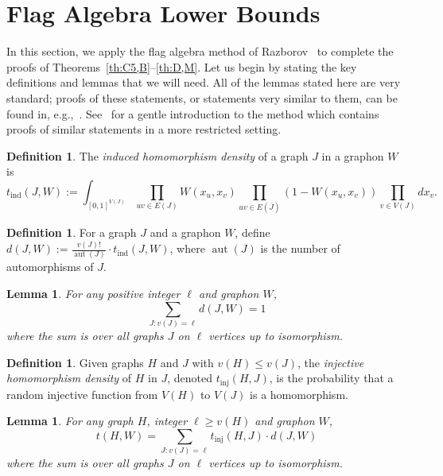 \documentclass[12pt]{article}
\numberwithin{equation}{section}
\newtheorem{lem}[equation]{Lemma}
\theoremstyle{definition}
\newtheorem{defn}[equation]{Definition}
\theoremstyle{remark}
\DeclareMathOperator{\inj}{inj}
\DeclareMathOperator{\ind}{ind}
\DeclareMathOperator{\aut}{aut}
\begin{document}
\section{Flag Algebra Lower Bounds}
\label{sec:flags}

In this section, we apply the flag algebra method of Razborov~\cite{Razborov07} to complete the proofs of Theorems~\ref{th:C5,B}--\ref{th:D,M}. Let us begin by stating the key definitions and lemmas that we will need. All of the lemmas stated here are very standard; proofs of these statements, or statements very similar to them, can be found in, e.g.,~\cite{Lovasz12,Razborov07}. See~\cite[Section~5]{BehagueMorrisonNoel25} for a gentle introduction to the method which contains proofs of similar statements in a more restricted setting.


\begin{defn}
The \emph{induced homomorphism density} of a graph $J$ in a graphon $W$ is
\[t_{\ind}(J,W):=\int_{[0,1]^{V(J)}}\prod_{uv\in E(J)}W(x_u,x_v)\prod_{uv\in E(\overline{J})}(1-W(x_u,x_v))\prod_{v\in V(J)}dx_v.\]
\end{defn}

\begin{defn}
For a graph $J$ and a graphon $W$, define $d(J,W):=\frac{v(J)!}{\aut(J)}\cdot t_{\ind}(J,W)$, where $\aut(J)$ is the number of automorphisms of $J$.
\end{defn}

\begin{lem}
\label{lem:sumToOne}
For any positive integer $\ell$ and graphon $W$,
\[\sum_{J:v(J)=\ell}d(J,W)=1\]
where the sum is over all graphs $J$ on $\ell$ vertices up to isomorphism. 
\end{lem}

\begin{defn}
Given graphs $H$ and $J$ with $v(H)\leq v(J)$, the \emph{injective homomorphism density} of $H$ in $J$, denoted $t_{\inj}(H,J)$, is the probability that a random injective function from $V(H)$ to $V(J)$ is a homomorphism. 
\end{defn}

\begin{lem}
\label{lem:tind}
For any graph $H$, integer $\ell\geq v(H)$ and graphon $W$, 
\[t(H,W)=\sum_{J: v(J)=\ell}t_{\inj}(H,J)\cdot d(J,W)\]
where the sum is over all graphs $J$ on $\ell$ vertices up to isomorphism. 
\end{lem}
\end{document}
